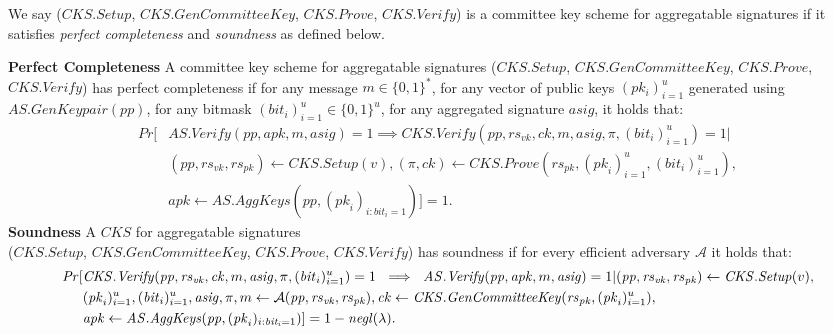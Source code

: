 \begin{definition}
\noindent We say ($\mathit{CKS.Setup}$, $\mathit{CKS.GenCommitteeKey}$, $\mathit{CKS.Prove}$, $\mathit{CKS.Verify}$) 
is a committee key scheme for aggregatable signatures if it satisfies \emph{perfect completeness} and 
\emph{soundness} as defined below.

\vspace{-0.1cm}
\noindent \textbf{Perfect Completeness} A committee key scheme for aggregatable signatures 
($\mathit{CKS.Setup}$, $\mathit{CKS.GenCommitteeKey}$, $\mathit{CKS.Prove}$, $\mathit{CKS.Verify}$)
has perfect completeness if for any message $m \in \{0,1\}^*$, 
for any vector of public keys $(\mathit{pk_i})_{i=1}^{u}$ generated using $\mathit{AS.GenKeypair}(\mathit{pp})$, 
for any bitmask $(\mathit{bit_i})_{i=1}^{u} \in \{0,1\}^u$,  for any aggregated signature $\mathit{asig}$, 
it holds that: 
\vspace{-0.1cm}
\begin{align*}
\mathit{Pr}[&\mathit{AS.Verify}(\mathit{pp}, \mathit{apk}, m, \mathit{asig}) = 1 \implies 
\mathit{CKS.Verify}(\mathit{pp}, \mathit{rs}_{\mathit{vk}}, \mathit{ck}, m, \mathit{asig}, \pi, (\mathit{bit}_{i})_{i=1}^u) =1 | \\
& (\mathit{pp}, \mathit{rs}_{\mathit{vk}}, \mathit{rs}_{\mathit{pk}}) \leftarrow 
\mathit{CKS.Setup}(v), 
(\pi, \mathit{ck}) \leftarrow \mathit{CKS.Prove}(\mathit{rs}_{\mathit{pk}}, (\mathit{pk}_{i})_{i=1}^u, (\mathit{bit_i})_{i=1}^u), \\
& \mathit{apk} \leftarrow \mathit{AS.AggKeys}(\mathit{pp}, (\mathit{pk}_{i})_{i:\mathit{bit_i}=1})]=1.
\end{align*} 
\vspace{-0.08cm}
\noindent \textbf{Soundness} A $\mathit{CKS}$ for aggregatable signatures \\
($\mathit{CKS.Setup}$, $\mathit{CKS.GenCommitteeKey}$, $\mathit{CKS.Prove}$, $\mathit{CKS.Verify}$)
has soundness if for every efficient adversary $\mathcal{A}$ it holds that: 
\begin{align*}
\mathit{Pr}[&\mathit{CKS.Verify}(\mathit{pp}, \mathit{rs}_{\mathit{vk}}, \mathit{ck}, m,  \mathit{asig}, \pi, (\mathit{bit}_{i})_{i=1}^u) =1 \
 \implies \ \mathit{AS.Verify}(\mathit{pp}, \mathit{apk}, m, \mathit{asig}) = 1  |  (\mathit{pp}, \mathit{rs}_{\mathit{vk}},\mathit{rs}_{\mathit{pk}}) \leftarrow \mathit{CKS.Setup}(v),\\
& (\mathit{pk}_{i})_{i=1}^u, (\mathit{bit}_{i})_{i=1}^u, \mathit{asig}, \pi, m  \leftarrow \mathcal{A}(\mathit{pp}, \mathit{rs}_{\mathit{vk}}, \mathit{rs}_{\mathit{pk}}), 
 \mathit{ck} \leftarrow \mathit{CKS.GenCommitteeKey}(\mathit{rs}_{\mathit{pk}}, (\mathit{pk}_{i})_{i=1}^u), \\
& \mathit{apk} \leftarrow \mathit{AS.AggKeys}( \mathit{pp},( \mathit{pk}_{i})_{i:\mathit{bit_i}=1})] = 1 - \mathit{negl}(\lambda).
\end{align*}
\end{definition}

